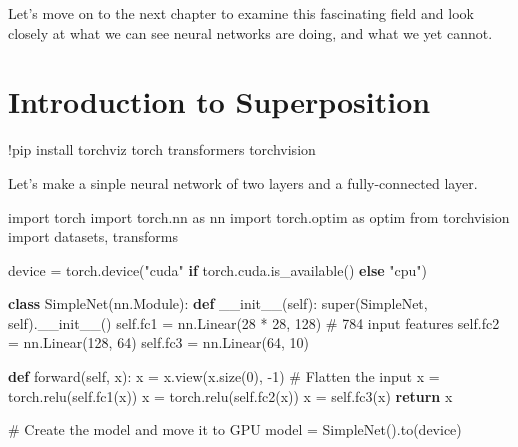 \documentclass[
  letterpaper,
  DIV=11,
  numbers=noendperiod]{scrreprt}
\newenvironment{Shaded}{\begin{snugshade}}{\end{snugshade}}
\newcommand{\BuiltInTok}[1]{\textcolor[rgb]{0.00,0.23,0.31}{#1}}
\newcommand{\CommentTok}[1]{\textcolor[rgb]{0.37,0.37,0.37}{#1}}
\newcommand{\ControlFlowTok}[1]{\textcolor[rgb]{0.00,0.23,0.31}{\textbf{#1}}}
\newcommand{\DecValTok}[1]{\textcolor[rgb]{0.68,0.00,0.00}{#1}}
\newcommand{\FunctionTok}[1]{\textcolor[rgb]{0.28,0.35,0.67}{#1}}
\newcommand{\ImportTok}[1]{\textcolor[rgb]{0.00,0.46,0.62}{#1}}
\newcommand{\KeywordTok}[1]{\textcolor[rgb]{0.00,0.23,0.31}{\textbf{#1}}}
\newcommand{\NormalTok}[1]{\textcolor[rgb]{0.00,0.23,0.31}{#1}}
\newcommand{\OperatorTok}[1]{\textcolor[rgb]{0.37,0.37,0.37}{#1}}
\newcommand{\StringTok}[1]{\textcolor[rgb]{0.13,0.47,0.30}{#1}}
\newcommand{\VariableTok}[1]{\textcolor[rgb]{0.07,0.07,0.07}{#1}}
\begin{document}
Let's move on to the next chapter to examine this fascinating field and
look closely at what we can see neural networks are doing, and what we
yet cannot.


\chapter{Introduction to
Superposition}\label{introduction-to-superposition}

\begin{Shaded}
\begin{Highlighting}[]
\OperatorTok{!}\NormalTok{pip install torchviz torch transformers torchvision}
\end{Highlighting}
\end{Shaded}

Let's make a sinple neural network of two layers and a fully-connected
layer.

\begin{Shaded}
\begin{Highlighting}[]
\ImportTok{import}\NormalTok{ torch}
\ImportTok{import}\NormalTok{ torch.nn }\ImportTok{as}\NormalTok{ nn}
\ImportTok{import}\NormalTok{ torch.optim }\ImportTok{as}\NormalTok{ optim}
\ImportTok{from}\NormalTok{ torchvision }\ImportTok{import}\NormalTok{ datasets, transforms}

\NormalTok{device }\OperatorTok{=}\NormalTok{ torch.device(}\StringTok{"cuda"} \ControlFlowTok{if}\NormalTok{ torch.cuda.is\_available() }\ControlFlowTok{else} \StringTok{"cpu"}\NormalTok{)}

\KeywordTok{class}\NormalTok{ SimpleNet(nn.Module):}
    \KeywordTok{def} \FunctionTok{\_\_init\_\_}\NormalTok{(}\VariableTok{self}\NormalTok{):}
        \BuiltInTok{super}\NormalTok{(SimpleNet, }\VariableTok{self}\NormalTok{).}\FunctionTok{\_\_init\_\_}\NormalTok{()}
        \VariableTok{self}\NormalTok{.fc1 }\OperatorTok{=}\NormalTok{ nn.Linear(}\DecValTok{28} \OperatorTok{*} \DecValTok{28}\NormalTok{, }\DecValTok{128}\NormalTok{)  }\CommentTok{\# 784 input features}
        \VariableTok{self}\NormalTok{.fc2 }\OperatorTok{=}\NormalTok{ nn.Linear(}\DecValTok{128}\NormalTok{, }\DecValTok{64}\NormalTok{)}
        \VariableTok{self}\NormalTok{.fc3 }\OperatorTok{=}\NormalTok{ nn.Linear(}\DecValTok{64}\NormalTok{, }\DecValTok{10}\NormalTok{)}

    \KeywordTok{def}\NormalTok{ forward(}\VariableTok{self}\NormalTok{, x):}
\NormalTok{        x }\OperatorTok{=}\NormalTok{ x.view(x.size(}\DecValTok{0}\NormalTok{), }\OperatorTok{{-}}\DecValTok{1}\NormalTok{)  }\CommentTok{\# Flatten the input}
\NormalTok{        x }\OperatorTok{=}\NormalTok{ torch.relu(}\VariableTok{self}\NormalTok{.fc1(x))}
\NormalTok{        x }\OperatorTok{=}\NormalTok{ torch.relu(}\VariableTok{self}\NormalTok{.fc2(x))}
\NormalTok{        x }\OperatorTok{=} \VariableTok{self}\NormalTok{.fc3(x)}
        \ControlFlowTok{return}\NormalTok{ x}

\CommentTok{\# Create the model and move it to GPU}
\NormalTok{model }\OperatorTok{=}\NormalTok{ SimpleNet().to(device)}
\end{Highlighting}
\end{Shaded}
\end{document}
